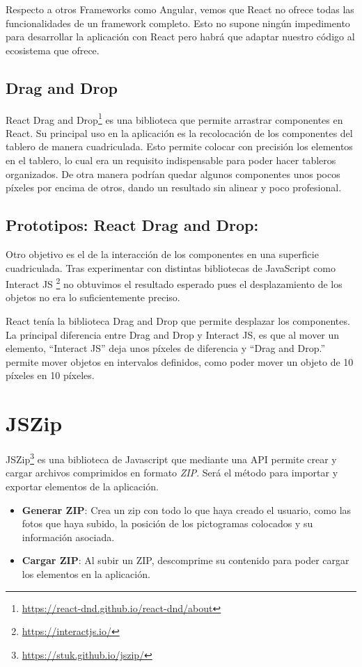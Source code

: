 Respecto a otros Frameworks como Angular, vemos que React no ofrece todas las funcionalidades de un framework completo. Esto no supone ningún impedimento para desarrollar la aplicación con React pero habrá que adaptar nuestro código al ecosistema que ofrece.



\subsection{Drag and Drop}

React Drag and Drop\footnote{\url{https://react-dnd.github.io/react-dnd/about}} es una biblioteca que permite arrastrar componentes en React. Su principal uso en la aplicación es la recolocación de los componentes del tablero de manera cuadriculada. Esto permite colocar con precisión los elementos en el tablero, lo cual era un requisito indispensable para poder hacer tableros organizados. De otra manera podrían quedar algunos componentes unos pocos píxeles por encima de otros, dando un resultado sin alinear y poco profesional.

\subsection{Prototipos: React Drag and Drop:}

Otro objetivo es el de la interacción de los componentes en una superficie cuadriculada. Tras experimentar con distintas bibliotecas de JavaScript como Interact JS \footnote{\url{https://interactjs.io/}} no obtuvimos el resultado esperado pues el desplazamiento de los objetos no era lo suficientemente preciso.

React tenía la biblioteca Drag and Drop que permite desplazar los componentes. La principal diferencia entre Drag and Drop y Interact JS, es que al mover un elemento, “Interact JS”  deja unos píxeles de diferencia y “Drag and Drop.” permite mover objetos en intervalos definidos, como poder mover un objeto de 10 píxeles en 10 píxeles.

\section{JSZip}

JSZip\footnote{\url{https://stuk.github.io/jszip/}} es una biblioteca de Javascript que mediante una API permite crear y cargar archivos comprimidos en formato \textit{ZIP}. Será el método para importar y exportar elementos de la aplicación.
\begin{itemize}
	\item \textbf{Generar ZIP}: Crea un zip con todo lo que haya creado el usuario, como las fotos que haya subido, la posición de los pictogramas colocados y su información asociada.
	\item \textbf{Cargar ZIP}: Al subir un ZIP, descomprime su contenido para poder cargar los elementos en la aplicación.
\end{itemize}	


